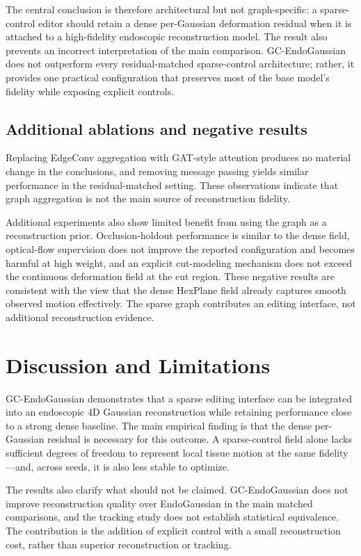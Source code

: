 \documentclass[AMA,Times1COL]{WileyNJDv5} %
\begin{document}
The central conclusion is therefore architectural but not graph-specific: a sparse-control editor should retain a dense per-Gaussian deformation residual when it is attached to a high-fidelity endoscopic reconstruction model. The result also prevents an incorrect interpretation of the main comparison. GC-EndoGaussian does not outperform every residual-matched sparse-control architecture; rather, it provides one practical configuration that preserves most of the base model's fidelity while exposing explicit controls.

\subsection{Additional ablations and negative results}

Replacing EdgeConv aggregation with GAT-style attention produces no material change in the conclusions, and removing message passing yields similar performance in the residual-matched setting. These observations indicate that graph aggregation is not the main source of reconstruction fidelity.

Additional experiments also show limited benefit from using the graph as a reconstruction prior. Occlusion-holdout performance is similar to the dense field, optical-flow supervision does not improve the reported configuration and becomes harmful at high weight, and an explicit cut-modeling mechanism does not exceed the continuous deformation field at the cut region. These negative results are consistent with the view that the dense HexPlane field already captures smooth observed motion effectively. The sparse graph contributes an editing interface, not additional reconstruction evidence.

\section{Discussion and Limitations}\label{sec6}

GC-EndoGaussian demonstrates that a sparse editing interface can be integrated into an endoscopic 4D Gaussian reconstruction while retaining performance close to a strong dense baseline. The main empirical finding is that the dense per-Gaussian residual is necessary for this outcome. A sparse-control field alone lacks sufficient degrees of freedom to represent local tissue motion at the same fidelity---and, across seeds, it is also less stable to optimize.

The results also clarify what should not be claimed. GC-EndoGaussian does not improve reconstruction quality over EndoGaussian in the main matched comparisons, and the tracking study does not establish statistical equivalence. The contribution is the addition of explicit control with a small reconstruction cost, rather than superior reconstruction or tracking.
\end{document}
